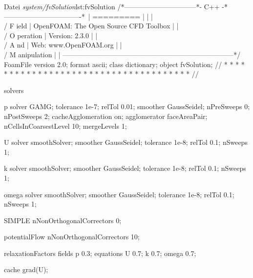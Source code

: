 \begin{dict}{Datei \textit{system/fvSolution}}{lst:fvSolution}
/*--------------------------------*- C++ -*----------------------------------*\
| =========                 |                                                 |
| \\      /  F ield         | OpenFOAM: The Open Source CFD Toolbox           |
|  \\    /   O peration     | Version:  2.3.0                                 |
|   \\  /    A nd           | Web:      www.OpenFOAM.org                      |
|    \\/     M anipulation  |                                                 |
\*---------------------------------------------------------------------------*/
FoamFile
{
    version     2.0;
    format      ascii;
    class       dictionary;
    object      fvSolution;
}
// * * * * * * * * * * * * * * * * * * * * * * * * * * * * * * * * * * * * * //

solvers
{
    p
    {
        solver           GAMG;
        tolerance        1e-7;
        relTol           0.01;
        smoother         GaussSeidel;
        nPreSweeps       0;
        nPostSweeps      2;
        cacheAgglomeration on;
        agglomerator     faceAreaPair;
        nCellsInCoarsestLevel 10;
        mergeLevels      1;
    }

    U
    {
        solver           smoothSolver;
        smoother         GaussSeidel;
        tolerance        1e-8;
        relTol           0.1;
        nSweeps          1;
    }

    k
    {
        solver           smoothSolver;
        smoother         GaussSeidel;
        tolerance        1e-8;
        relTol           0.1;
        nSweeps          1;
    }

    omega
    {
        solver           smoothSolver;
        smoother         GaussSeidel;
        tolerance        1e-8;
        relTol           0.1;
        nSweeps          1;
    }
}

SIMPLE
{
    nNonOrthogonalCorrectors 0;
}

potentialFlow
{
    nNonOrthogonalCorrectors 10;
}

relaxationFactors
{
    fields
    {
        p               0.3;
    }
    equations
    {
        U               0.7;
        k               0.7;
        omega           0.7;
    }
}

cache
{
    grad(U);
}
\end{dict}

